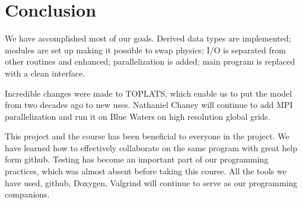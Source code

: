 \documentclass[pdftex,12pt,a4paper]{article}
\begin{document}
\section{Conclusion}

We have accomplished most of our goals. Derived data types are implemented; modules are set up making it possible to swap physics; I/O is separated from other routines and enhanced; parallelization is added; main program is replaced with a clean interface. 

Incredible changes were made to TOPLATS, which enable us to put the model from two decades ago to new uses. Nathaniel Chaney will continue to add MPI parallelization and run it on Blue Waters on high resolution global grids. 

This project and the course has been beneficial to everyone in the project. We have learned how to effectively collaborate on the same program with great help form github. Testing has become an important part of our programming practices, which was almost absent before taking this course. All the tools we have used, github, Doxygen, Valgrind will continue to serve as our programming companions.
\end{document}

